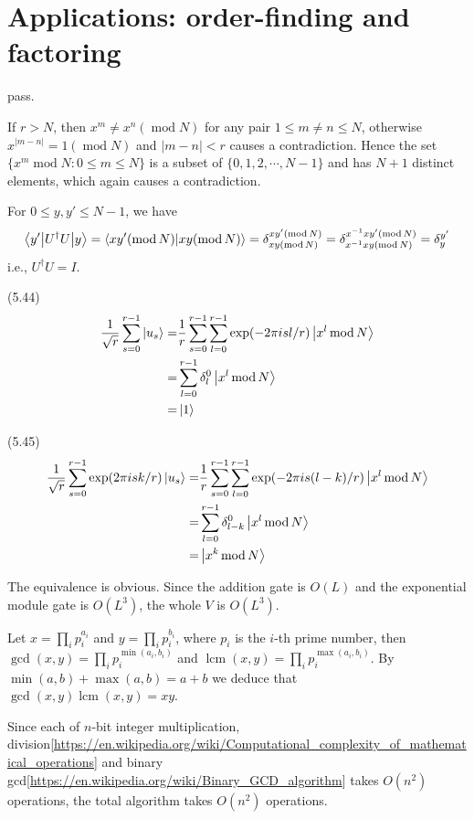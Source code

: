 \section{Applications: order-finding and factoring}

\ex pass.

\ex If $r>N$, then $x^m\neq x^n(\operatorname{mod }N)$ for any pair $1\le m\neq n\le N$, otherwise $x^{|m-n|}=1(\operatorname{mod }N)$ and $|m-n|<r$ causes a contradiction. Hence the set $\{x^m\operatorname{ mod }N:0\le m\le N\}$ is a subset of $\{0,1,2,\cdots,N-1\}$ and has $N+1$ distinct elements, which again causes a contradiction.

\ex For $0\le y,y'\le N-1$, we have
$$\left\langle y'\middle|U^\dagger U\middle|y\right\rangle = \left\langle xy'(\operatorname{mod }N)\middle|xy(\operatorname{mod }N)\right\rangle = \delta_{xy(\operatorname{mod }N)}^{xy'(\operatorname{mod }N)} = \delta_{x^{-1}xy(\operatorname{mod }N)}^{x^{-1}xy'(\operatorname{mod }N)} = \delta_y^{y'}$$
i.e., $U^\dagger U=I$.

\ex (5.44) 
$$\begin{aligned}
    \frac{1}{\sqrt{r}}\sum_{s=0}^{r-1}\left|u_s\right\rangle
    = & \frac{1}{r}\sum_{s=0}^{r-1}\sum_{l=0}^{r-1}\exp(-2\pi isl/r)\left|x^l\operatorname{ mod }N\right\rangle
    \\ = & \sum_{l=0}^{r-1}\delta_l^0\left|x^l\operatorname{ mod }N\right\rangle
    \\ = & \left|1\right\rangle
\end{aligned}$$

(5.45) 
$$\begin{aligned}
    \frac{1}{\sqrt{r}}\sum_{s=0}^{r-1}\exp(2\pi isk/r)\left|u_s\right\rangle
    = & \frac{1}{r}\sum_{s=0}^{r-1}\sum_{l=0}^{r-1}\exp(-2\pi is(l-k)/r)\left|x^l\operatorname{ mod }N\right\rangle
    \\ = & \sum_{l=0}^{r-1}\delta_{l-k}^0\left|x^l\operatorname{ mod }N\right\rangle
    \\ = & \left|x^k\operatorname{ mod }N\right\rangle
\end{aligned}$$

\ex The equivalence is obvious. Since the addition gate is $O(L)$ and the exponential module gate is $O(L^3)$, the whole $V$ is $O(L^3)$.

\ex Let $x=\prod_ip_i^{a_i}$ and $y=\prod_ip_i^{b_i}$, where $p_i$ is the $i$-th prime number, then $\gcd(x,y)=\prod_ip_i^{\min(a_i,b_i)}$ and $\operatorname{lcm}(x,y)=\prod_ip_i^{\max(a_i,b_i)}$. By $\min(a,b)+\max(a,b)=a+b$ we deduce that $\gcd(x,y)\operatorname{lcm}(x,y)=xy$.

Since each of $n$-bit integer multiplication, division[\url{https://en.wikipedia.org/wiki/Computational_complexity_of_mathematical_operations}] and binary gcd[\url{https://en.wikipedia.org/wiki/Binary_GCD_algorithm}] takes $O(n^2)$ operations, the total algorithm takes $O(n^2)$ operations.

